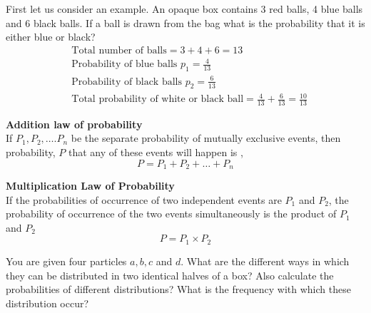 First let us consider an example. An opaque box contains 3 red balls, 4 blue balls and 6 black balls. If a ball is drawn from the bag what is the probability that it is either blue or black?
\begin{align*}
&\text{Total number of balls}=3+4+6=13\\
&\text{Probability of blue balls $p_1$}=\frac{4}{13}\\
&\text{Probability of black balls $p_2$}=\frac{6}{13}\\
&\text{Total probability of white or black ball}=\frac{4}{13}+\frac{6}{13}=\frac{10}{13}
\end{align*}
\begin{theorem}\textbf{Addition law of probability}\\
	If $P_{1}, P_{2}, \ldots . P_{n}$ be the separate probability of mutually exclusive events, then probability, $P$ that any of these events will happen is , $$P=P_{1}+P_{2}+\ldots+P_{n}$$
\end{theorem}
\begin{theorem}\textbf{Multiplication Law of Probability}\\
If the probabilities of occurrence of two independent events are $P_{1}$ and $P_{2}$, the probability of occurrence of the two events simultaneously is the product of $P_{1}$ and $P_{2}$
$$ P=P_{1} \times P_{2}$$
\end{theorem}
\begin{exercise}
	You are given four particles $a, b, c$ and $d$. What are the different ways in which they can be distributed in two identical halves of a box? Also calculate the probabilities of different distributions? What is the frequency with which these distribution occur?
\end{exercise}
